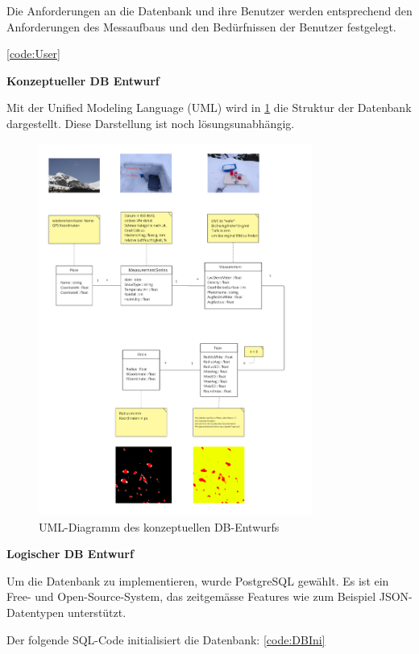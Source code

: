Die Anforderungen an die Datenbank und ihre Benutzer werden entsprechend den Anforderungen des Messaufbaus und den Bedürfnissen der Benutzer festgelegt.

\ref{code:User}

\textbf{Konzeptueller DB Entwurf}

Mit der Unified Modeling Language (UML) wird in  \ref{fig:uml-db-entwurf} die Struktur der Datenbank dargestellt. Diese Darstellung ist noch lösungsunabhängig.

\begin{figure}
    \centering
    \includegraphics[width=0.8\textwidth]{Bilder/Screenshotfrom2024-04-1418-05-35.png}
    \caption{UML-Diagramm des konzeptuellen DB-Entwurfs}
    \label{fig:uml-db-entwurf}
\end{figure}



\textbf{Logischer DB Entwurf}


Um die Datenbank zu implementieren, wurde PostgreSQL gewählt. Es ist ein Free- und Open-Source-System, das zeitgemässe Features wie zum Beispiel JSON-Datentypen unterstützt.

Der folgende SQL-Code initialisiert die Datenbank: \ref{code:DBIni}


